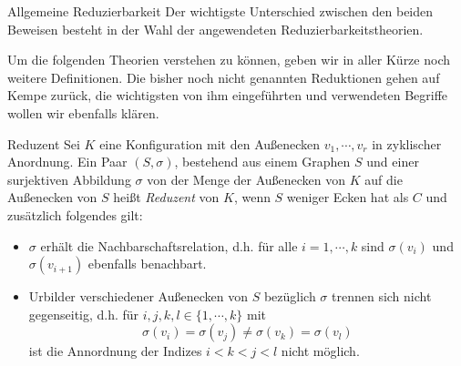 \begin{section}{Allgemeine Reduzierbarkeit}
 \label{sec:AHRed}
 Der wichtigste Unterschied zwischen den beiden Beweisen besteht in der Wahl der angewendeten Reduzierbarkeitstheorien. 
 
 Um die folgenden Theorien verstehen zu können, geben wir in aller Kürze noch weitere Definitionen. Die bisher noch nicht genannten Reduktionen gehen auf Kempe zurück, die wichtigsten von ihm eingeführten und verwendeten Begriffe wollen wir ebenfalls klären.
 
 \begin{definition}{Reduzent}
  Sei $K$ eine Konfiguration mit den Außenecken $v_1,\cdots,v_r$ in zyklischer Anordnung. Ein Paar $(S,\sigma)$, bestehend aus einem Graphen $S$ und einer surjektiven Abbildung $\sigma$ von der Menge der Außenecken von $K$ auf die Außenecken von $S$ heißt \textit{Reduzent} von $K$, wenn $S$ weniger Ecken hat als $C$ und zusätzlich folgendes gilt:
  \begin{itemize}
   \item $\sigma$ erhält die Nachbarschaftsrelation, d.h. für alle $i = 1,\cdots,k$ sind $\sigma(v_i)$ und $\sigma(v_{i+1})$ ebenfalls benachbart.
   \item Urbilder verschiedener Außenecken von $S$ bezüglich $\sigma$ trennen sich nicht gegenseitig, d.h. für $i,j,k,l \in \{1,\cdots,k\}$ mit
   \[ \sigma(v_i) = \sigma(v_j) \neq \sigma(v_k) = \sigma(v_l)\]
   ist die Annordnung der Indizes $i < k < j < l$ nicht möglich.
  \end{itemize}
 \end{definition}
 

\end{section}
